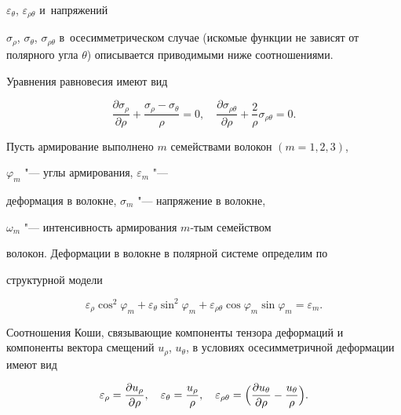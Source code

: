$\varepsilon_\theta$, $\varepsilon_{\rho\theta}$ и~напряжений

$\sigma_{\rho}$, $\sigma_\theta$, $\sigma_{\rho\theta}$  в~осесимметрическом случае (искомые функции не зависят от полярного угла $\theta$) описывается приводимыми ниже соотношениями.




Уравнения равновесия имеют вид

\begin{equation}

\label{eq:nemfed:pol8} \dfrac{\partial

\sigma_{\rho}}{\partial\rho}

+\dfrac{\sigma_{\rho}-\sigma_{\theta}}{\rho}=0, \quad

\dfrac{\partial

\sigma_{\rho\theta}}{\partial\rho}+\dfrac{2}{\rho}\sigma_{\rho\theta}=0.

\end{equation}



Пусть армирование выполнено $m$ семействами волокон $(m=1, 2, 3)$,

$\varphi_{m}$ "--- углы армирования, $\varepsilon_{m}$ "---

деформация в волокне, $\sigma_m$ "--- напряжение в волокне,

$\omega_{m}$ "--- интенсивность армирования $m$-тым семейством

волокон. Деформации в волокне в полярной системе определим по

структурной модели~\cite{nemfed:bib:N}

\begin{equation} \label{eq:nemfed:pol5}

\varepsilon_\rho\cos^2\varphi_m+\varepsilon_\theta\sin^2\varphi_m+

\varepsilon_{\rho\theta}\cos\varphi_m\sin\varphi_m=\varepsilon_m.

\end{equation}



Соотношения Коши, связывающие компоненты тензора деформаций и компоненты вектора смещений $u_{\rho}$, $u_{\theta}$,  в условиях осесимметричной деформации имеют вид

\begin{equation}

\label{eq:nemfed:pol7} \varepsilon_{\rho}=\dfrac{\partial

u_\rho}{\partial\rho},\quad \varepsilon_{\theta}=

\dfrac{u_{\rho}}{\rho},  \quad \varepsilon_{\rho\theta}=\Bigl(

\dfrac{\partial u_{\theta}}{\partial

\rho}-\dfrac{u_{\theta}}{\rho}\Bigr).

\end{equation}



